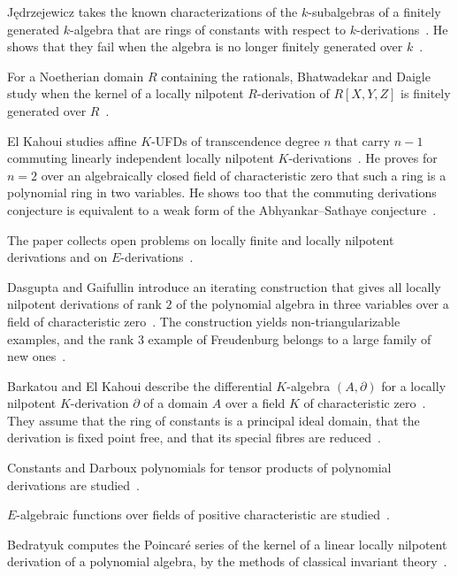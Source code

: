 J\k{e}drzejewicz takes the known characterizations of the $k$-subalgebras
of a finitely generated $k$-algebra that are rings of constants with respect
to $k$-derivations~\cite{WlANoteOnCharacterizationsOfRing2004}. He shows that they fail when the algebra is no longer
finitely generated over
$k$~\cite{WlANoteOnCharacterizationsOfRing2004}.

For a Noetherian domain $R$ containing the rationals, Bhatwadekar and Daigle
study when the kernel of a locally nilpotent $R$-derivation of $R[X,Y,Z]$ is
finitely generated over $R$~\cite{WlOnFiniteGenerationOfKernelsOfL2009}.

El Kahoui studies affine $K$-UFDs of transcendence degree $n$ that carry $n-1$
commuting linearly independent locally nilpotent $K$-derivations~\cite{WlUfdsWithCommutingLinearlyIndep2005}. He proves for
$n=2$ over an algebraically closed field of characteristic zero that such a
ring is a polynomial ring in two variables. He shows too that the commuting
derivations conjecture is equivalent to a weak form of the Abhyankar--Sathaye
conjecture~\cite{WlUfdsWithCommutingLinearlyIndep2005}.

The paper collects open problems on locally finite and locally nilpotent
derivations and on
$E$-derivations~\cite{WlSomeOpenProblemsOnLocallyFinit2018}.

Dasgupta and Gaifullin introduce an iterating construction that gives all
locally nilpotent derivations of rank $2$ of the polynomial algebra in three
variables over a field of characteristic zero~\cite{WlOnLocallyNilpotentDerivationsO2025}. The construction yields
non-triangularizable
examples, and the rank $3$ example of Freudenburg belongs to a large
family of new ones~\cite{WlOnLocallyNilpotentDerivationsO2025}.

Barkatou and El Kahoui describe the differential $K$-algebra $(A,\partial)$
for a locally nilpotent $K$-derivation $\partial$ of a domain $A$ over a field
$K$ of characteristic zero~\cite{WlLocallyNilpotentDerivationsWit2011}. They assume that the ring of constants is a
principal ideal
domain, that the derivation is fixed point free, and that its special fibres are
reduced~\cite{WlLocallyNilpotentDerivationsWit2011}.

Constants and Darboux polynomials for tensor products of polynomial
derivations are studied~\cite{WlConstantsAndDarbouxPolynomials2020}.

$E$-algebraic functions over fields of positive characteristic are
studied~\cite{WlEAlgebraicFunctionsOverFieldsO2020}.

Bedratyuk computes the Poincar\'e series of the kernel of a linear locally
nilpotent derivation of a polynomial algebra, by the methods of classical
invariant theory~\cite{WlLinearLocallyNilpotentDerivati2009}.
